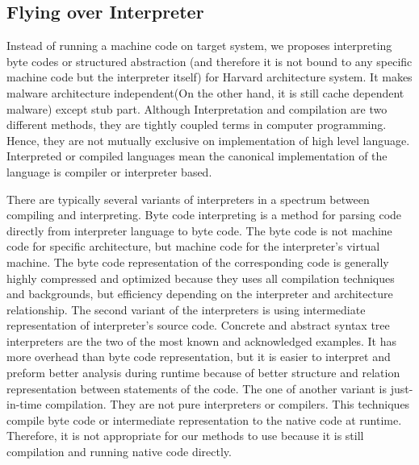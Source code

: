 	\subsection{Flying over Interpreter}
	Instead of running a machine code on target system, we proposes interpreting byte codes or structured abstraction (and therefore it is not bound to any specific machine code but the interpreter itself) for Harvard architecture system. It makes malware architecture independent(On the other hand, it is still cache dependent malware) except stub part. Although Interpretation and compilation are two different methods, they are tightly coupled terms in computer programming. Hence, they are not mutually exclusive on implementation of high level language. Interpreted or compiled languages mean the canonical implementation of the language is compiler or interpreter based\cite{mak2011writing}.

	There are typically several variants of interpreters in a spectrum between compiling and interpreting\cite{mak2011writing}. Byte code interpreting is a method for parsing code directly from interpreter language to byte code. The byte code is not machine code for specific architecture, but machine code for the interpreter's virtual machine. The byte code representation of the corresponding code is generally highly compressed and optimized because they uses all compilation techniques and backgrounds, but efficiency depending on the interpreter and architecture relationship\cite{mak2011writing}. The second variant of the interpreters is using intermediate representation of interpreter's source code. Concrete and abstract syntax tree interpreters are the two of the most known and acknowledged examples. It has more overhead than byte code representation, but it is easier to interpret and preform better analysis during runtime because of better structure and relation representation between statements of the code\cite{mak2011writing}. The one of another variant is just-in-time compilation. They are not pure interpreters or compilers. This techniques compile byte code or intermediate representation to the native code at runtime. Therefore, it is not appropriate for our methods to use because it is still compilation and running native code directly. 

